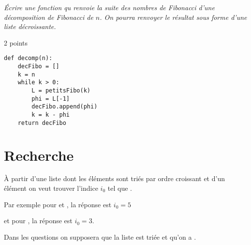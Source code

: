 \begin{Exercise}\it
Écrire une fonction  qu renvoie la suite des nombres de Fibonacci d'une décomposition de Fibonacci de $n$. On pourra renvoyer le résultat sous forme d'une liste décroissante.
\end{Exercise}
\begin{Answer}2 points
\begin{lstlisting}
def decomp(n):
    decFibo = []
    k = n
    while k > 0:
        L = petitsFibo(k)
        phi = L[-1]
        decFibo.append(phi)
        k = k - phi
    return decFibo

\end{lstlisting}
\end{Answer}
\section{Recherche}
À partir d'une liste  dont les éléments sont triés par ordre croissant et d'un élément  on veut trouver l'indice $i_0$ tel que . 

Par exemple pour  et , la réponse est $i_0=5$ 

et pour , la réponse est $i_0=3$.

Dans les questions on supposera que la liste est triée et qu'on a .

